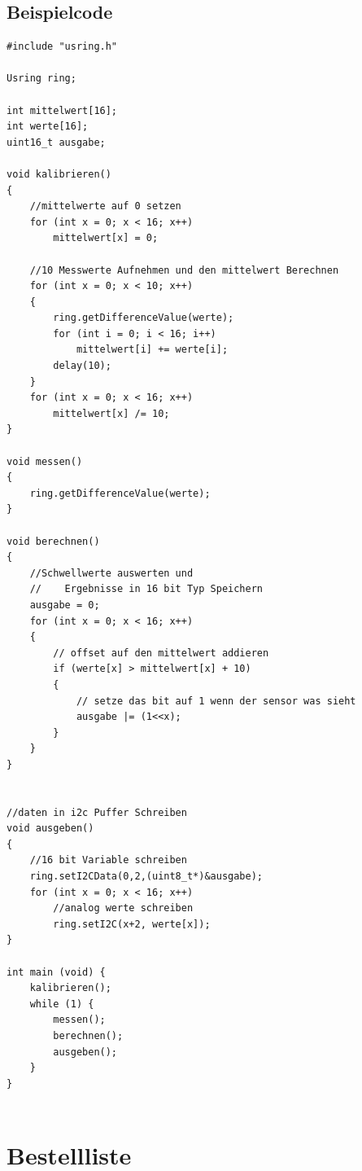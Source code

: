 \documentclass{article}
\begin{document}
\subsection{Beispielcode}


\begin{lstlisting}
#include "usring.h"

Usring ring;

int mittelwert[16];
int werte[16];
uint16_t ausgabe;

void kalibrieren()
{
	//mittelwerte auf 0 setzen
	for (int x = 0; x < 16; x++)
		mittelwert[x] = 0;
	
	//10 Messwerte Aufnehmen und den mittelwert Berechnen
	for (int x = 0; x < 10; x++)
	{
		ring.getDifferenceValue(werte);
		for (int i = 0; i < 16; i++)
			mittelwert[i] += werte[i];
		delay(10);
	}
	for (int x = 0; x < 16; x++)
		mittelwert[x] /= 10;
}

void messen()
{
	ring.getDifferenceValue(werte);
}

void berechnen()
{
	//Schwellwerte auswerten und 
	//    Ergebnisse in 16 bit Typ Speichern
	ausgabe = 0;
	for (int x = 0; x < 16; x++)
	{
		// offset auf den mittelwert addieren
		if (werte[x] > mittelwert[x] + 10) 	
		{
			// setze das bit auf 1 wenn der sensor was sieht
			ausgabe |= (1<<x); 
		}
	}
}


//daten in i2c Puffer Schreiben
void ausgeben()
{
	//16 bit Variable schreiben
	ring.setI2CData(0,2,(uint8_t*)&ausgabe); 
	for (int x = 0; x < 16; x++)
		//analog werte schreiben
		ring.setI2C(x+2, werte[x]); 
}

int main (void) {
	kalibrieren();
	while (1) {
		messen();
		berechnen();
		ausgeben();
	}                
}


\end{lstlisting}

\section{Bestellliste}
\end{document}
